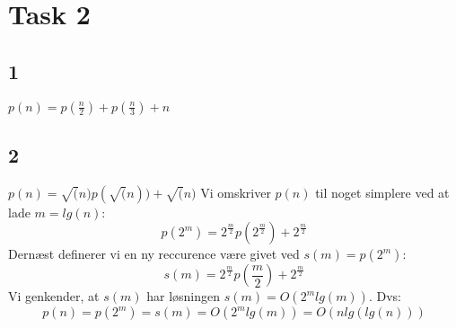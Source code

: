 \section{Task 2}

\subsection{1}

$p(n) = p(\frac{n}{2}) + p(\frac{n}{3}) + n$

\subsection{2}

$p(n) = \sqrt(n)p(\sqrt(n)) + \sqrt(n)$
Vi omskriver $p(n)$ til noget simplere ved at lade $m = lg(n)$:
$$p(2^m) = 2^{\frac{m}{2}}p(2^{\frac{m}{2}}) + 2^{\frac{m}{2}}$$
Dernæst definerer vi en ny reccurence være givet ved $s(m) = p(2^m)$:
$$s(m) = 2^{\frac{m}{2}}p(\frac{m}{2}) + 2^{\frac{m}{2}}$$
Vi genkender, at $s(m)$ har løsningen $s(m) = O(2^mlg(m))$.
Dvs:
$$p(n) = p(2^m) = s(m) = O(2^mlg(m)) = O(nlg(lg(n)))$$
